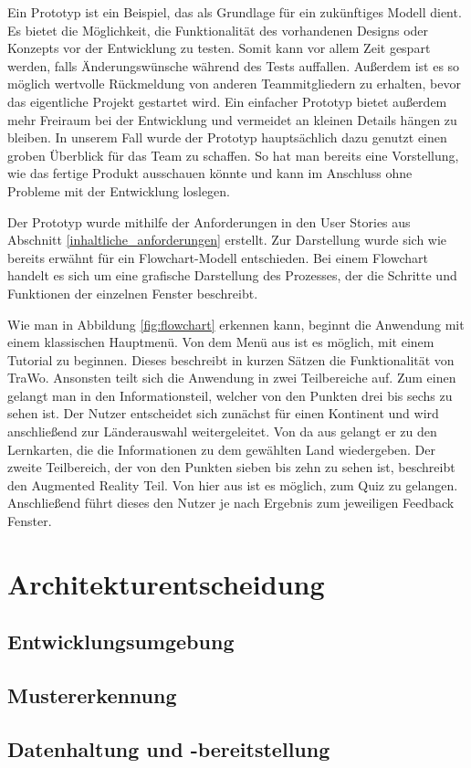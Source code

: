 Ein Prototyp ist ein Beispiel, das als Grundlage für ein zukünftiges Modell dient. Es bietet die Möglichkeit, die Funktionalität des vorhandenen Designs oder Konzepts vor der Entwicklung zu testen. Somit kann vor allem Zeit gespart werden, falls Änderungswünsche während des Tests auffallen. Außerdem ist es so möglich wertvolle Rückmeldung von anderen Teammitgliedern zu erhalten, bevor das eigentliche Projekt gestartet wird. Ein einfacher Prototyp bietet außerdem mehr Freiraum bei der Entwicklung und vermeidet an kleinen Details hängen zu bleiben. In unserem Fall wurde der Prototyp hauptsächlich dazu genutzt einen groben Überblick für das Team zu schaffen. So hat man bereits eine Vorstellung, wie das fertige Produkt ausschauen könnte und kann im Anschluss ohne Probleme mit der Entwicklung loslegen.

Der Prototyp wurde mithilfe der Anforderungen in den User Stories aus Abschnitt \ref{inhaltliche_anforderungen} erstellt. Zur Darstellung wurde sich wie bereits erwähnt für ein Flowchart-Modell entschieden. Bei einem Flowchart handelt es sich um eine grafische Darstellung des Prozesses, der die Schritte und Funktionen der einzelnen Fenster beschreibt.

Wie man in Abbildung \ref{fig:flowchart} erkennen kann, beginnt die Anwendung mit einem klassischen Hauptmenü. Von dem Menü aus ist es möglich, mit einem Tutorial zu beginnen. Dieses beschreibt in kurzen Sätzen die Funktionalität von TraWo. Ansonsten teilt sich die Anwendung in zwei Teilbereiche auf. Zum einen gelangt man in den Informationsteil, welcher von den Punkten drei bis sechs zu sehen ist. Der Nutzer entscheidet sich zunächst für einen Kontinent und wird anschließend zur Länderauswahl weitergeleitet. Von da aus gelangt er zu den Lernkarten, die die Informationen zu dem gewählten Land wiedergeben. Der zweite Teilbereich, der von den Punkten sieben bis zehn zu sehen ist, beschreibt den Augmented Reality Teil. Von hier aus ist es möglich, zum Quiz zu gelangen. Anschließend führt dieses den Nutzer je nach Ergebnis zum jeweiligen Feedback Fenster.


\section{Architekturentscheidung}
\subsection{Entwicklungsumgebung}\label{entwicklungsumgebung}
\subsection{Mustererkennung}
\subsection{Datenhaltung und -bereitstellung}
